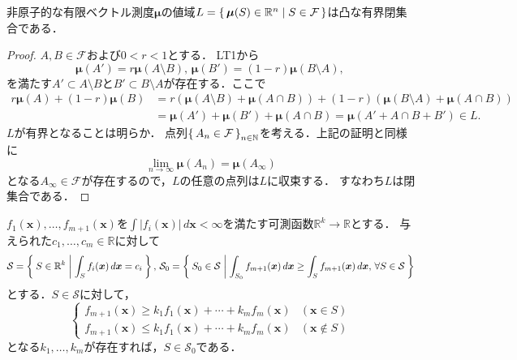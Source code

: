 \begin{screen}
  \begin{thm}
    非原子的な有限ベクトル測度\(\boldsymbol\mu\)の値域\(L=\set{ \boldsymbol\mu(S) \in \mathbb{R}^n | S \in \mathcal{F} }\)は凸な有界閉集合である．
  \end{thm}
\end{screen}
\begin{proof}
  \(A, B \in \mathcal{F}\)および\(0<r<1\)とする．
  LT1から
  \[ \boldsymbol\mu(A') = r \boldsymbol\mu(A\setminus B) , \, \boldsymbol\mu(B') = (1-r) \boldsymbol\mu(B\setminus A) , \, \]
  を満たす\(A'\subset A\setminus B\)と\(B'\subset B\setminus A\)が存在する．ここで
  \begin{align*}
    r \boldsymbol\mu(A) + (1-r) \boldsymbol\mu(B)
    &= r (\boldsymbol\mu(A\setminus B)+\boldsymbol\mu(A\cap B))
    + (1-r) (\boldsymbol\mu(B\setminus A)+\boldsymbol\mu(A\cap B)) \\
    &= \boldsymbol\mu(A') + \boldsymbol\mu(B') + \boldsymbol\mu(A\cap B)
    = \boldsymbol\mu(A' + A\cap B + B') \in L .
  \end{align*}
  \(L\)が有界となることは明らか．
  点列\(\set{A_n \in \mathcal{F}}_{n\in\mathbb{N}}\)を考える．上記の証明と同様に
  \[ \lim_{n\to\infty} \boldsymbol\mu(A_n) = \boldsymbol\mu(A_\infty) \]
  となる\(A_\infty\in\mathcal{F}\)が存在するので，\(L\)の任意の点列は\(L\)に収束する．
  すなわち\(L\)は閉集合である．
\end{proof}

\begin{screen}
  \begin{thm}
    \(f_1(\boldsymbol{x}), \ldots, f_{m+1}(\boldsymbol{x})\)を\(\int  \lvert f_i(\boldsymbol{x}) \rvert \, d\boldsymbol{x} < \infty\)を満たす可測函数\(\mathbb{R}^k\to\mathbb{R}\)とする．
    与えられた\(c_1, \ldots, c_m \in \mathbb{R}\)に対して
    \[
    \mathcal{S} = \Set{S \in \mathbb{R}^k | \int_S f_i(\boldsymbol{x}) \, d\boldsymbol{x} = c_i } , \,
    \mathcal{S}_0 = \Set{S_0 \in \mathcal{S} | \int_{S_0} f_{m+1}(\boldsymbol{x}) \, d\boldsymbol{x} \geq \int_S f_{m+1}(\boldsymbol{x}) \, d\boldsymbol{x} , \, \forall S \in \mathcal{S} }
    \]
    とする．\(S \in \mathcal{S}\)に対して，
    \[
    \begin{cases}
      f_{m+1}(\boldsymbol{x}) \geq k_1 f_1(\boldsymbol{x}) + \cdots + k_m f_m(\boldsymbol{x}) & (\boldsymbol{x} \in S) \\
      f_{m+1}(\boldsymbol{x}) \leq k_1 f_1(\boldsymbol{x}) + \cdots + k_m f_m(\boldsymbol{x}) & (\boldsymbol{x} \not\in S)
    \end{cases}
    \]
    となる\(k_1, \ldots, k_m\)が存在すれば，\(S \in \mathcal{S}_0\)である．
  \end{thm}
\end{screen}

